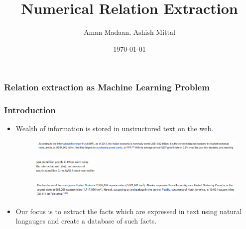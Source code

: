 \documentclass{beamer}
\begin{document}
\title{Numerical Relation Extraction}  
\author{Aman Madaan, Ashish Mittal}
\date{\today}

\begin{frame}
 \frametitle{Relation extraction as Machine Learning Problem}
 
 
\end{frame}

\begin{frame}
\frametitle{Introduction}

\begin{itemize}
 
 \item  Wealth of information is stored in unstructured text on the web.
 
  \begin{figure}
    \centering
    \includegraphics[width = 1.0\textwidth]{images/ex_1}
  \end{figure}
  
  \begin{figure}
    \centering
    \includegraphics[width = 0.3\textwidth]{images/ex_2}
  \end{figure}
  
    \begin{figure}
    \centering
    \includegraphics[width = 1.0\textwidth]{images/ex_3}
  \end{figure}
  

  \item Our focus is to extract the facts which are expressed in text using natural langauges and 
  create a database of such facts.
 
\end{itemize}

\end{frame}
\end{document}
